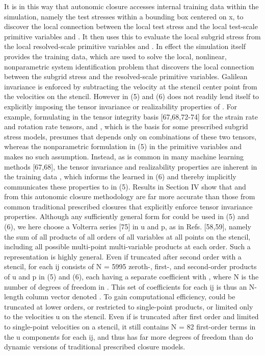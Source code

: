It is in this way that autonomic closure accesses internal training data within the simulation, namely the test stresses within a bounding box centered on x, to discover the local connection   between the local test stress   and the local test-scale primitive variables   and  . It then uses this   to evaluate the local subgrid stress   from the local resolved-scale primitive variables   and  . In effect the simulation itself provides the training data, which are used to solve the local, nonlinear, nonparametric system identification problem that discovers the local connection between the subgrid stress and the resolved-scale primitive variables. 
Galilean invariance is enforced by subtracting the velocity at the stencil center point from the velocities on the stencil. However   in (5) and (6) does not readily lend itself to explicitly imposing the tensor invariance or realizability properties of  . For example, formulating   in the tensor integrity basis [67,68,72-74] for the strain rate and rotation rate tensors,   and  , which is the basis for some prescribed subgrid stress models, presumes that   depends only on combinations of these two tensors, whereas the nonparametric formulation in (5) in the primitive variables   and   makes no such assumption. Instead, as is common in many machine learning methods [67,68], the tensor invariance and realizability properties are inherent in the training data  , which informs the learned   in (6) and thereby implicitly communicates these properties to   in (5). Results in Section IV show that   and   from this autonomic closure methodology are far more accurate than those from common traditional prescribed closures that explicitly enforce tensor invariance properties. 
Although any sufficiently general form for   could be used in (5) and (6), we here choose a Volterra series [75] in u and p, as in Refs. [58,59], namely the sum of all products of all orders of all variables at all points on the stencil, including all possible multi-point multi-variable products at each order. Such a representation is highly general. Even if truncated after second order with a   stencil,   for each ij consists of N = 5995 zeroth-, first-, and second-order products of u and p in (5) and (6), each having a separate coefficient   with  , where N is the number of degrees of freedom in  . This set of coefficients for each ij is thus an N-length column vector denoted  . To gain computational efficiency,   could be truncated at lower orders, or restricted to single-point products, or limited only to the velocities u on the stencil. Even if   is truncated after first order and limited to single-point velocities on a   stencil, it still contains N = 82 first-order terms in the u components for each ij, and thus has far more degrees of freedom than do dynamic versions of traditional prescribed closure models.  
